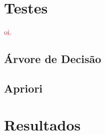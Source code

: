 \label{chapter:Avaliacao}


\section{Testes}

\par
\textcolor{red}{oi.}

\subsection{Árvore de Decisão}

\subsection{Apriori}

\section{Resultados}
